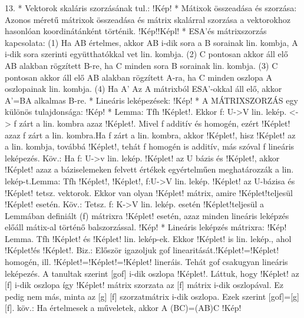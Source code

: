 \documentclass[10pt]{article}
\begin{document}
13.
* Vektorok skaláris szorzásának tul.: !Kép!
* Mátixok összeadása és szorzása: Azonos méretű mátrixok összeadása és mátrix skalárral szorzása a vektorokhoz hasonlóan koordinátánként történik. !Kép!!Képl!
* ESA'és mátrixszorzás kapcsolata: (1) Ha AB értelmes, akkor AB i-dik sora a B sorainak lin. kombja, A i-dik sora szerinti együtthatókkal vet lin. kombja.  (2) C pontosan akkor áll elő AB alakban rögzített B-re, ha C minden sora B sorainak lin. kombja. (3) C pontosan akkor áll elő AB alakban rögzített A-ra, ha C minden oszlopa A oszlopainak lin. kombja. (4) Ha A' Az A mátrixból ESA'-okkal áll elő, akkor A'=BA alkalmas B-re.
* Lineáris leképezések: !Kép!
* A MÁTRIXSZORZÁS egy különös tulajdonsága: !Kép!
* Lemma: Tfh !Képlet!. Ekkor f: U->V lin. lekép. <-> f zárt a lin. kombra azaz !Képlet!. Mivel f additív és homogén, ezért !Képlet! azaz f zárt a lin. kombra.Ha f zárt a lin. kombra, akkor !Képlet!, hisz !Képlet! az a lin. kombja, továbbá !Képlet!, tehát f homogén is additív, más szóval f lineáris leképezés. Köv.: Ha f: U->v lin. lekép. !Képlet! az U bázis és !Képlet!, akkor !Képlet! azaz a báziselemeken felvett értékek egyértelműen meghatározzák a lin. lekép-t.Lemma: Tfh !Képlet!, !Képlet!, f:U->V lin. lekép. !Képlet! az U-bázisa és !Képlet! tetsz. vektorok. Ekkor van olyan !Képlet! mátrix, amire !Képlet!teljesül !Képlet! esetén. Köv.: Tetsz. f: K->V lin. lekép. esetén !Képlet!teljesül a Lemmában definiált (f) mátrixra !Képlet! esetén, azaz minden lineáris leképzés előáll mátix-al történő balszorzással. !Kép!
* Lineáris leképzés mátrixra: !Kép! Lemma. Tfh !Képlet! és !Képlet! lin. lekép-ek. Ekkor !Képlet! is lin. lekép., ahol !Képlet!és !Képlet!. Biz.: Először igazoljuk gof linearitását.!Képlet!=!Képlet! homogén, ill. !Képlet!=!Képlet!=!Képlet! lineráis. Tehát gof csakugyan lineáris leképezés. A tanultak szerint [gof] i-dik oszlopa !Képlet!. Láttuk, hogy !Képlet! az [f] i-dik oszlopa így !Képlet! mátrix szorzata az [f] mátrix i-dik oszlopával. Ez pedig nem más, minta az [g] [f] szorzatmátrix i-dik oszlopa. Ezek szerint [gof]=[g] [f]. köv.: Ha értelmesek a műveletek, akkor A (BC)=(AB)C !Kép!
\end{document}
